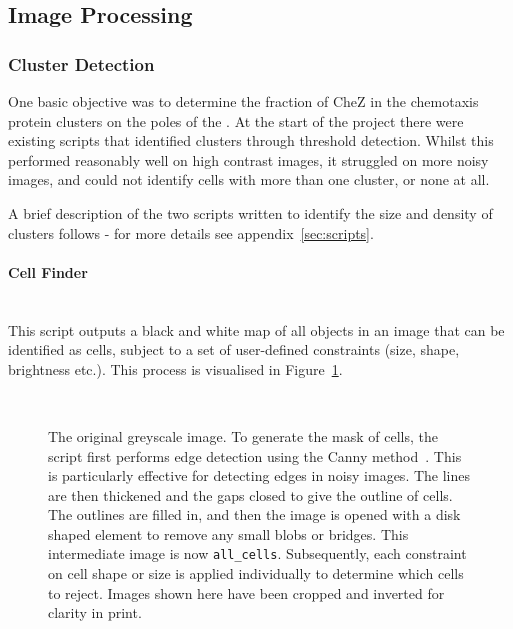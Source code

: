 \documentclass[../main.tex]{subfiles}
\begin{document}
\subsection{Image Processing}
\label{sec:results:imageprocessing}

\subsubsection{Cluster Detection}
One basic objective was to determine the fraction of CheZ in the chemotaxis protein clusters on the poles of the \ecoli. At the start of the project there were existing scripts that identified clusters through threshold detection. Whilst this performed reasonably well on high contrast images, it struggled on more noisy images, and could not identify cells with more than one cluster, or none at all.

A brief description of the two scripts written to identify the size and density of clusters follows - for more details see appendix~\ref{sec:scripts}.

\paragraph{Cell Finder}\ \\
This script outputs a black and white map of all objects in an image that can be identified as cells, subject to a set of user-defined constraints (size, shape, brightness etc.). This process is visualised in Figure~\ref{fig:imageprocessing:celldetection}.

\begin{figure}[p]
\begin{center}
\\
\caption[Depiction of cell detection]{ The original greyscale image.  To generate the mask of cells, the script first performs edge detection using the Canny method~\citep{canny}. This is particularly effective for detecting edges in noisy images. The lines are then thickened and the gaps closed to give the outline of cells.  The outlines are filled in, and then the image is opened with a disk shaped element to remove any small blobs or bridges. This intermediate image is now \texttt{all\_cells}.  Subsequently, each constraint on cell shape or size is applied individually to determine which cells to reject. Images shown here have been cropped and inverted for clarity in print.}
\label{fig:imageprocessing:celldetection}
\end{center}
\end{figure}
\end{document}

